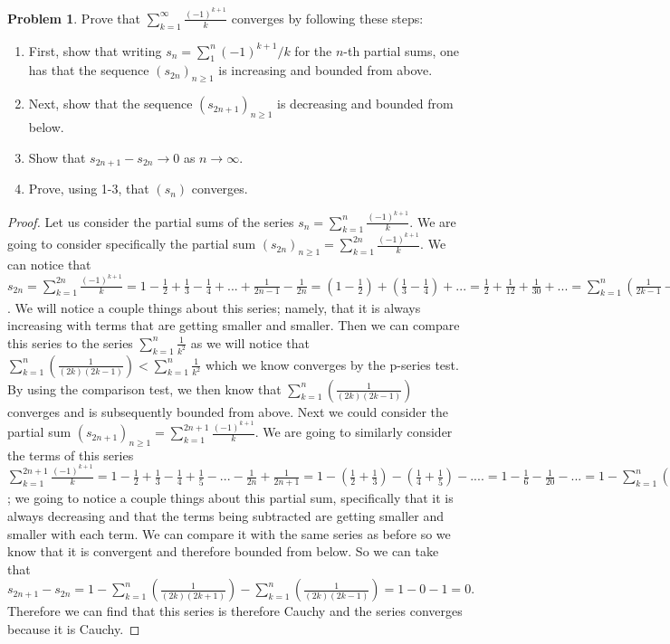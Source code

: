 \documentclass[11pt]{article}
\theoremstyle{definition}
\newtheorem{problem}{Problem}
\begin{document}
\pagebreak
\begin{problem}
Prove that $\sum_{k = 1}^\infty \frac{(-1)^{k + 1}}{k}$ converges by following these steps: 

\begin{enumerate}
\item First, show that writing $s_n = \sum_1^n (-1)^{k+1} / k$ for the $n$-th partial sums, one has that the sequence $(s_{2n})_{n \geq 1}$ is increasing and bounded from above. 
\item Next, show that the sequence $(s_{2 n + 1})_{n \geq 1}$ is decreasing and bounded from below. 
\item Show that $s_{2n+1} - s_{2n} \to 0$ as $n \to \infty$.
\item Prove, using 1-3, that $(s_n)$ converges. 
\end{enumerate}

\end{problem}

\begin{proof}
Let us consider the partial sums of the series $s_n = \sum_{k=1}^{n}\frac{(-1)^{k+1}}{k}$. We are going to consider specifically the partial sum $(s_{2n})_{n\geq 1} = \sum_{k=1}^{2n}\frac{(-1)^{k+1}}{k}.$ We can notice that $s_{2n} = \sum_{k=1}^{2n}\frac{(-1)^{k+1}}{k} = 1 - \frac{1}{2} + \frac{1}{3} - \frac{1}{4} + ... + \frac{1}{2n-1} - \frac{1}{2n} = (1-\frac{1}{2}) + (\frac{1}{3} - \frac{1}{4}) + ... = \frac{1}{2} + \frac{1}{12} + \frac{1}{30} + ... = \sum_{k = 1}^n (\frac{1}{2k-1}- \frac{1}{2k}) = \sum_{k = 1}^n (\frac{1}{(2k)(2k-1)})$. We will notice a couple things about this series; namely, that it is always increasing with terms that are getting smaller and smaller. Then we can compare this series to the series $\sum_{k = 1}^n \frac{1}{k^2}$ as we will notice that $\sum_{k = 1}^n (\frac{1}{(2k)(2k-1)}) < \sum_{k = 1}^n \frac{1}{k^2}$ which we know converges by the p-series test. By using the comparison test, we then know that $\sum_{k = 1}^n (\frac{1}{(2k)(2k-1)})$ converges and is subsequently bounded from above. Next we could consider the partial sum $(s_{2n+1})_{n\geq 1} = \sum_{k=1}^{2n+1}\frac{(-1)^{k+1}}{k}$. We are going to similarly consider the terms of this series $\sum_{k=1}^{2n+1}\frac{(-1)^{k+1}}{k} = 1 - \frac{1}{2} + \frac{1}{3} - \frac{1}{4} + \frac{1}{5} - ... - \frac{1}{2n} + \frac{1}{2n+1} = 1 - (\frac{1}{2} + \frac{1}{3}) - (\frac{1}{4} + \frac{1}{5}) - .... = 1 - \frac{1}{6} - \frac{1}{20} - ... = 1 - \sum_{k = 1}^n(\frac{1}{2k}-\frac{1}{2k+1}) = 1 - \sum_{k = 1}^n(\frac{1}{(2k)(2k+1)})$; we going to notice a couple things about this partial sum, specifically that it is always decreasing and that the terms being subtracted are getting smaller and smaller with each term. We can compare it with the same series as before so we know that it is convergent and therefore bounded from below. So we can take that $s_{2n+1} - s_{2n} = 1 - \sum_{k = 1}^n(\frac{1}{(2k)(2k+1)}) - \sum_{k = 1}^n (\frac{1}{(2k)(2k-1)}) = 1 - 0 - 1 = 0.$ Therefore we can find that this series is therefore Cauchy and the series converges because it is Cauchy.
\end{proof}
\end{document}
